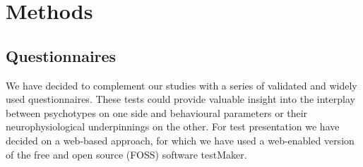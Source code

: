 \chapter{Methods}
    \section{Questionnaires}
	We have decided to complement our studies with a series of validated and widely used questionnaires.
	These tests could provide valuable insight into the interplay between psychotypes on one side and behavioural parameters or their neurophysiological underpinnings on the other.
	For test presentation we have decided on a web-based approach, for which we have used a web-enabled version of the free and open source (FOSS) software testMaker\cite{testmaker}.
	
